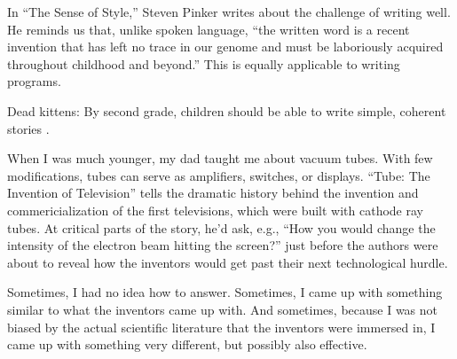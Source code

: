 In ``The Sense of Style,'' Steven Pinker writes about the challenge of writing well. He reminds us that, unlike spoken language, ``the written word is a recent invention that has left no trace in our genome and must be laboriously acquired throughout childhood and beyond.'' This is equally applicable to writing programs.




Dead kittens:
By second grade, children should be able to write simple, coherent stories \cite{http://www.webmd.com/parenting/features/when-should-kids-learn-read-write-math}. 





When I was much younger, my dad taught me about vacuum tubes. With few modifications, tubes can serve as amplifiers, switches, or displays. ``Tube: The Invention of Television'' tells the dramatic history behind the invention and commericialization of the first televisions, which were built with cathode ray tubes. At critical parts of the story, he'd ask, e.g., ``How you would change the intensity of the electron beam hitting the screen?'' just before the authors were about to reveal how the inventors would get past their next technological hurdle.

Sometimes, I had no idea how to answer. Sometimes, I came up with something similar to what the inventors came up with. And sometimes, because I was not biased by the actual scientific literature that the inventors were immersed in, I came up with something very different, but possibly also effective. 






